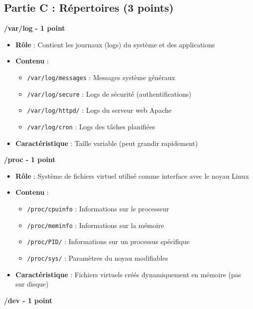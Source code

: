 \documentclass[12pt,a4paper]{article}
\begin{document}
\subsection*{Partie C : Répertoires (3 points)}

\begin{answerbox}
\textbf{/var/log - 1 point}

\begin{itemize}
    \item \textbf{Rôle} : Contient les journaux (logs) du système et des applications
    \item \textbf{Contenu} :
    \begin{itemize}
        \item \texttt{/var/log/messages} : Messages système généraux
        \item \texttt{/var/log/secure} : Logs de sécurité (authentifications)
        \item \texttt{/var/log/httpd/} : Logs du serveur web Apache
        \item \texttt{/var/log/cron} : Logs des tâches planifiées
    \end{itemize}
    \item \textbf{Caractéristique} : Taille variable (peut grandir rapidement)
\end{itemize}

\textbf{/proc - 1 point}

\begin{itemize}
    \item \textbf{Rôle} : Système de fichiers virtuel utilisé comme interface avec le noyau Linux
    \item \textbf{Contenu} :
    \begin{itemize}
        \item \texttt{/proc/cpuinfo} : Informations sur le processeur
        \item \texttt{/proc/meminfo} : Informations sur la mémoire
        \item \texttt{/proc/PID/} : Informations sur un processus spécifique
        \item \texttt{/proc/sys/} : Paramètres du noyau modifiables
    \end{itemize}
    \item \textbf{Caractéristique} : Fichiers virtuels créés dynamiquement en mémoire (pas sur disque)
\end{itemize}

\textbf{/dev - 1 point}


\end{answerbox}
\end{document}
